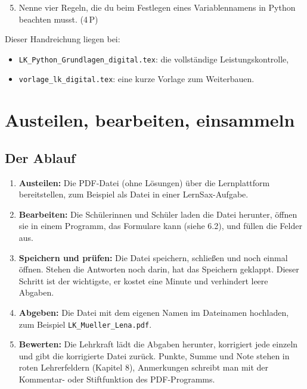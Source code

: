 \begin{Form}
\begin{ausgabe}
\begin{enumerate}[(1)]
  \setcounter{enumi}{4}
  \item Nenne vier Regeln, die du beim Festlegen eines Variablennamens in
  Python beachten musst. \hfill (4\,P)
\end{enumerate}
\end{ausgabe}


Dieser Handreichung liegen bei:

\begin{itemize}
	\item \texttt{LK\_Python\_Grundlagen\_digital.tex}: die vollständige Leistungskontrolle,
	\item \texttt{vorlage\_lk\_digital.tex}: eine kurze Vorlage zum Weiterbauen.
\end{itemize}



\section{Austeilen, bearbeiten, einsammeln}

\subsection{Der Ablauf}

\begin{enumerate}[(1)]
	\item \textbf{Austeilen:} Die PDF-Datei (ohne Lösungen) über die
	Lernplattform bereitstellen, zum Beispiel als Datei in einer LernSax-Aufgabe.
	\item \textbf{Bearbeiten:} Die Schülerinnen und Schüler laden die Datei
	herunter, öffnen sie in einem Programm, das Formulare kann (siehe 6.2),
	und füllen die Felder aus.
	\item \textbf{Speichern und prüfen:} Die Datei speichern, schließen und
	noch einmal öffnen. Stehen die Antworten noch darin, hat das Speichern
	geklappt. Dieser Schritt ist der wichtigste, er kostet eine Minute und
	verhindert leere Abgaben.
	\item \textbf{Abgeben:} Die Datei mit dem eigenen Namen im Dateinamen
	hochladen, zum Beispiel \texttt{LK\_Mueller\_Lena.pdf}.
	\item \textbf{Bewerten:} Die Lehrkraft lädt die Abgaben herunter,
	korrigiert jede einzeln und gibt die korrigierte Datei zurück. Punkte, Summe
	und Note stehen in roten Lehrerfeldern (Kapitel 8), Anmerkungen schreibt
	man mit der Kommentar- oder Stiftfunktion des PDF-Programms.
\end{enumerate}


\end{Form}
